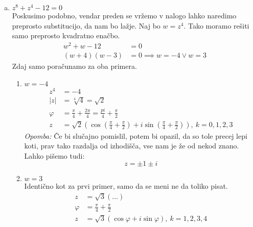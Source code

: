 \documentclass[12pt,a4paper,slovene]{article}
\begin{document}
\begin{enumerate}[(1)]
\begin{enumerate}[(a)]
        \item $z^8 + z^4 - 12 = 0$\\
        Poskusimo podobno, vendar preden se vržemo v nalogo lahko naredimo preprosto substitucijo, da nam bo lažje. Naj bo $w = z^4$. Tako moramo rešiti samo preprosto kvadratno enačbo.
        \begin{align*}
            w^2 + w - 12 &= 0\\
            (w + 4) (w - 3) &= 0 \implies w = -4 \lor w = 3 
        \end{align*}
        Zdaj samo poračunamo za oba primera.
        \begin{enumerate}
            \item $w=-4$
            \begin{align*}
                z^4 &= -4\\
                |z| &= \sqrt[4]{4} = \sqrt{2}\\
                \varphi &= \frac{\pi}{4} + \frac{2\pi}{4} = \frac{pi}{4} + \frac{\pi}{2}\\
                z &= \sqrt{2} (\cos(\frac{\pi}{4} + \frac{\pi}{2}) + i \sin (\frac{\pi}{4} + \frac{\pi}{2})), \ k = 0, 1, 2, 3
            \end{align*}
            \emph{Opomba:} Če bi slučajno pomislil, potem bi opazil, da so tole precej lepi koti, prav tako razdalja od izhodišča, vse nam je že od nekod znano. Lahko pišemo tudi:
            \[
            z = \pm 1 \pm i
            \]
            \item $w = 3$\\
            Identično kot za prvi primer, samo da se meni ne da toliko pisat.
            \begin{align*}
                z &= \sqrt{3} (\ldots)\\
                \varphi &= \frac{\pi}{4} + \frac{\pi}{2}\\
                z &= \sqrt{3} (\cos\varphi + i\sin \varphi),\ k = 1, 2, 3, 4\\
            \end{align*}
        \end{enumerate}
        

\end{enumerate}
\end{enumerate}
\end{document}
